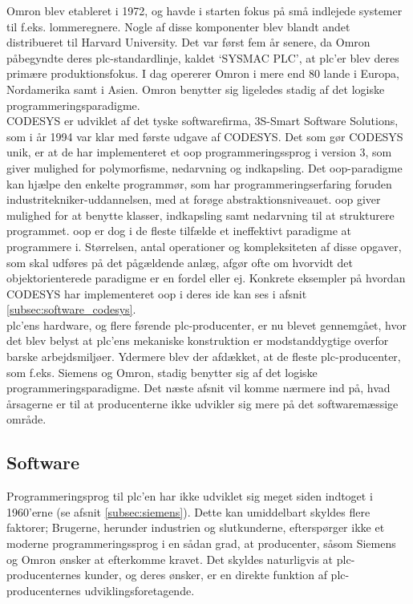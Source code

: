 \label{subsec:omron}
\noindent Omron blev etableret i 1972, og havde i starten fokus på små indlejede systemer til f.eks. lommeregnere. Nogle af disse komponenter blev blandt andet distribueret til Harvard University. Det var først fem år senere, da Omron påbegyndte deres \gls{plc}-standardlinje, kaldet \enquote*{SYSMAC PLC}, at \gls{plc}'er blev deres primære produktionsfokus. I dag opererer Omron i mere end 80 lande i Europa, Nordamerika samt i Asien\cite{plc-marked-shares}. Omron benytter sig ligeledes stadig af det logiske programmeringsparadigme.\\

\label{subsec:codesys}
\noindent CODESYS er udviklet af det tyske softwarefirma, 3S-Smart Software Solutions, som i år 1994 var klar med første udgave af CODESYS. Det som gør CODESYS unik, er at de har implementeret et \gls{oop} programmeringssprog i version 3, som giver mulighed for polymorfisme, nedarvning og indkapsling. Det \gls{oop}-paradigme kan hjælpe den enkelte programmør, som har programmeringserfaring foruden industritekniker-uddannelsen, med at forøge abstraktionsniveauet. \gls{oop} giver mulighed for at benytte klasser, indkapsling samt nedarvning til at strukturere programmet. \gls{oop} er dog i de fleste tilfælde et ineffektivt paradigme at programmere i. Størrelsen, antal operationer og kompleksiteten af disse opgaver, som skal udføres på det pågældende anlæg, afgør ofte om hvorvidt det objektorienterede paradigme er en fordel eller ej. Konkrete eksempler på hvordan CODESYS har implementeret \gls{oop} i deres \gls{ide} kan ses i afsnit \ref{subsec:software_codesys}. \\

\noindent \gls{plc}'ens hardware, og flere førende \gls{plc}-producenter, er nu blevet gennemgået, hvor det blev belyst at \gls{plc}'ens mekaniske konstruktion er modstanddygtige overfor barske arbejdsmiljøer. Ydermere blev der afdækket, at de fleste \gls{plc}-producenter, som f.eks. Siemens og Omron, stadig benytter sig af det logiske programmeringsparadigme. Det næste afsnit vil komme nærmere ind på, hvad årsagerne er til at producenterne ikke udvikler sig mere på det softwaremæssige område.

\subsection{Software}
\label{subsec:plcsoftware}
Programmeringsprog til \gls{plc}'en har ikke udviklet sig meget siden indtoget i 1960'erne (se afsnit \ref{subsec:siemens}). Dette kan umiddelbart skyldes flere faktorer; Brugerne, herunder industrien og slutkunderne, efterspørger ikke et moderne programmeringssprog i en sådan grad, at producenter, såsom Siemens og Omron ønsker at efterkomme kravet. Det skyldes naturligvis at \gls{plc}-producenternes kunder, og deres ønsker, er en direkte funktion af \gls{plc}-producenternes udviklingsforetagende. \\


